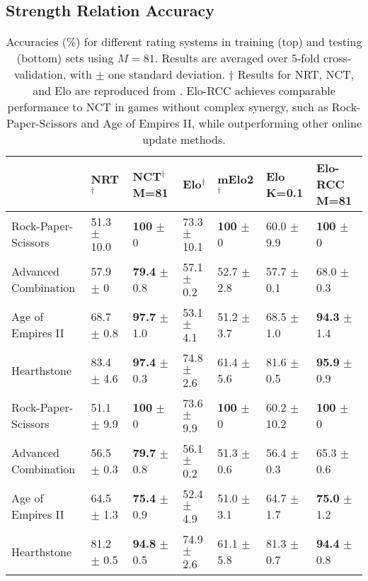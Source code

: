 \subsection{Strength Relation Accuracy}
\begin{table*}
\centering
\caption{Accuracies (\%) for different rating systems in training (top) and testing (bottom) sets using $M=81$. Results are averaged over 5-fold cross-validation, with $\pm$ one standard deviation. $\dagger$ Results for NRT, NCT, and Elo are reproduced from \citet{game_balance_analysis}. Elo-RCC achieves comparable performance to NCT in games without complex synergy, such as Rock-Paper-Scissors and Age of Empires II, while outperforming other online update methods.}

\label{table:precision_test1}
\begin{tabular}{lll|llll}
\toprule
\quad & \textbf{NRT$^\dagger$} & \textbf{NCT$^\dagger$} M=81& \textbf{Elo$^\dagger$} & \textbf{mElo2$^\dagger$} & \textbf{Elo} K=0.1 & \textbf{Elo-RCC} M=81 \\
\midrule
Rock-Paper-Scissors & 51.3 $\pm$ 10.0 & \textbf{100} $\pm$ 0 & 73.3 $\pm$ 10.1 & \textbf{100} $\pm$ 0 & 60.0 $\pm$ 9.9 & \textbf{100} $\pm$ 0\\
\midrule
Advanced Combination & 57.9 $\pm$ 0 & \textbf{79.4} $\pm$  0.8 & 57.1 $\pm$ 0.2 & 52.7 $\pm$ 2.8 & 57.7 $\pm$ 0.1 & 68.0 $\pm$ 0.3\\
\midrule
Age of Empires II & 68.7 $\pm$ 0.8 & \textbf{97.7} $\pm$ 1.0 & 53.1 $\pm$ 4.1 & 51.2 $\pm$ 3.7 & 68.5 $\pm$ 1.0 & \textbf{94.3} $\pm$ 1.4\\
\midrule
Hearthstone & 83.4 $\pm$ 4.6 & \textbf{97.4} $\pm$ 0.3 & 74.8 $\pm$ 2.6 & 61.4 $\pm$ 5.6 & 81.6 $\pm$ 0.5 & \textbf{95.9} $\pm$ 0.9\\
\bottomrule
\toprule
Rock-Paper-Scissors & 51.1 $\pm$ 9.9 & \textbf{100} $\pm$  0 & 73.6 $\pm$ 9.9 & \textbf{100} $\pm$ 0 & 60.2 $\pm$ 10.2 & \textbf{100} $\pm$ 0\\
\midrule
Advanced Combination & 56.5 $\pm$ 0.3 & \textbf{79.7} $\pm$ 0.8 & 56.1 $\pm$ 0.2 & 51.3 $\pm$ 0.6 & 56.4 $\pm$ 0.3 & 65.3 $\pm$ 0.6\\
\midrule
Age of Empires II & 64.5 $\pm$ 1.3 & \textbf{75.4} $\pm$ 0.9 & 52.4 $\pm$ 4.9 & 51.0 $\pm$ 3.1 & 64.7 $\pm$ 1.7& \textbf{75.0} $\pm$ 1.2\\
\midrule
Hearthstone & 81.2 $\pm$ 0.5 & \textbf{94.8} $\pm$ 0.5 & 74.9 $\pm$ 2.6 & 61.1 $\pm$ 5.8 & 81.3 $\pm$ 0.7 & \textbf{94.4} $\pm$ 0.8\\
\bottomrule
\end{tabular}
\end{table*}

